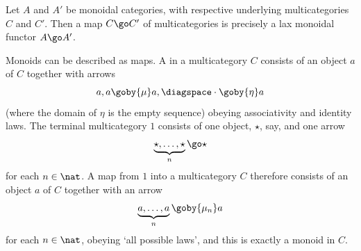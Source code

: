 \begin{example}	%
%
%
Let $A$ and $A'$ be monoidal categories, with respective underlying
multicategories $C$ and $C'$.  Then a map $C \go C'$ of multicategories is
precisely a lax monoidal functor $A \go A'$.
\end{example}

\begin{example}
Monoids can be described as maps.  A %
%
%
in a multicategory $C$
consists of an object $a$ of $C$ together with arrows
\[
a, a \goby{\mu} a,
\diagspace
\cdot \goby{\eta} a
\]
(where the domain of $\eta$ is the empty sequence) obeying associativity
and identity laws.  The terminal%
%
%
multicategory $1$ consists of one object,
$\star$, say, and one arrow
\[
\underbrace{\star, \ldots, \star}_n \go \star
\]
for each $n\in\nat$.  A map from $1$ into a multicategory $C$ therefore
consists of an object $a$ of $C$ together with an arrow
\[
\underbrace{a, \ldots, a}_n \goby{\mu_n} a
\]
for each $n\in\nat$, obeying `all possible laws', and this is exactly a
monoid in $C$. 
\end{example}

